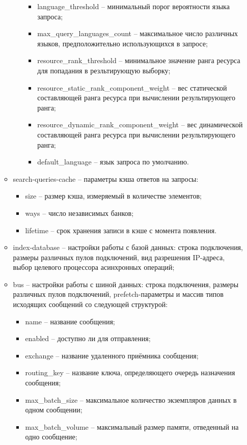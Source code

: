 \begin{itemize}
\begin{itemize}
\begin{itemize}
\begin{itemize}
\item language\_threshold -- минимальный порог вероятности языка запроса;
\item max\_query\_languages\_count -- максимальное число различных языков, предположительно использующихся в запросе;
\item resource\_rank\_threshold -- минимальное значение ранга ресурса для попадания в резльтирующую выборку;
\item resource\_static\_rank\_component\_weight -- вес статической составляющей ранга ресурса при вычислении результирующего ранга;
\item resource\_dynamic\_rank\_component\_weight -- вес динамической составляющей ранга ресурса при вычислении результирующего ранга;
\item default\_language -- язык запроса по умолчанию.
\end{itemize}
\end{itemize}
\item search-queries-cache -- параметры кэша ответов на запросы:
\begin{itemize}
\item size -- размер кэша, измеряемый в количестве элементов;
\item ways -- число независимых банков;
\item lifetime -- срок хранения записи в кэше с момента появления.
\end{itemize}
\item index-database -- настройки работы с базой данных:  строка подключения, размеры различных пулов подключений, вид разрешения IP-адреса, выбор целевого процессора асинхронных операций;
\item bus -- настройки работы с шиной данных: строка подключения, размеры различных пулов подключений, prefetch-параметры и массив типов исходящих сообщений со следующей структурой:
\begin{itemize}
\item name -- название сообщения;
\item enabled -- доступно ли для отправления;
\item exchange -- название удаленного приёмника сообщения;
\item routing\_key -- название ключа, определяющего очередь назначения сообщения;
\item max\_batch\_size -- максимальное количество экземпляров данных в одном сообщении;
\item max\_batch\_volume -- максимальный размер памяти, отведенный на одно сообщение;

\end{itemize}
\end{itemize}
\end{itemize}

